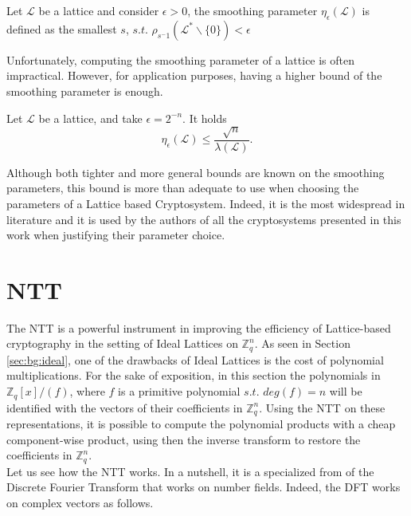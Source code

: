\begin{definition}
Let $\mathscr{L}$ be a lattice and consider $\epsilon>0$, the smoothing parameter $\eta_\epsilon(\mathscr{L})$ is defined as the smallest $s$, $s.t.$ $\rho_{s^-1}(\mathscr{L}^*\backslash\{0\})<\epsilon$
\end{definition}

Unfortunately, computing the smoothing parameter of a lattice is often impractical. However, for application purposes, having a higher bound of the smoothing parameter is enough.

\begin{theorem}
Let $\mathscr{L}$ be a lattice, and take $\epsilon=2^{-n}$. It holds
\begin{equation*}
\eta_\epsilon(\mathscr{L})\leq\frac{\sqrt{n}}{\lambda\left(\mathscr{L}\right)}.
\end{equation*}
\end{theorem}

Although both tighter and more general bounds are known on the smoothing parameters, this bound is more than adequate to use when choosing the parameters of a Lattice based Cryptosystem. Indeed, it is the most widespread in literature and it is used by the authors of all the cryptosystems presented in this work when justifying their parameter choice.

\section{NTT}\label{sec:bg:ntt}

The NTT is a powerful instrument in improving the efficiency of Lattice-based cryptography in the setting of Ideal Lattices on $\mathbb{Z}_q^n$. As seen in Section \ref{sec:bg:ideal}, one of the drawbacks of Ideal Lattices is the cost of polynomial multiplications. For the sake of exposition, in this section the polynomials in $\mathbb{Z}_q[x]/(f)$, where $f$ is a primitive polynomial $s.t.$ $deg(f)=n$ will be identified with the vectors of their coefficients in $\mathbb{Z}_q^n$. Using the NTT on these representations, it is possible to compute the polynomial products with a cheap component-wise product, using then the inverse transform to restore the coefficients in $\mathbb{Z}_q^n$.\\

Let us see how the NTT works. In a nutshell, it is a specialized from of the Discrete Fourier Transform that works on number fields. Indeed, the DFT works on complex vectors as follows.

